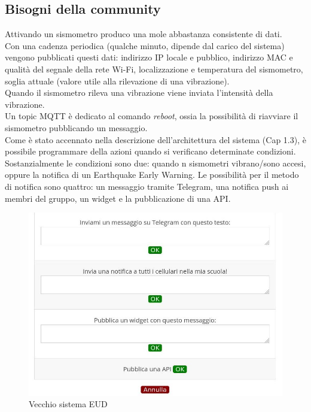 \documentclass[a4paper,10pt]{memoir}
\begin{document}
\subsection{Bisogni della community}

Attivando un sismometro produco una mole abbastanza consistente di dati.\\
Con una cadenza periodica (qualche minuto, dipende dal carico del sistema) vengono pubblicati questi dati: indirizzo IP locale e pubblico, indirizzo MAC e qualità del segnale della rete Wi-Fi, localizzazione e temperatura del sismometro, soglia attuale (valore utile alla rilevazione di una vibrazione).\\
Quando il sismometro rileva una vibrazione viene inviata l'intensità della vibrazione.\\
Un topic MQTT è dedicato al comando \textit{reboot}, ossia la possibilità di riavviare il sismometro pubblicando un messaggio.\\
Come è stato accennato nella descrizione dell'architettura del sistema (Cap 1.3), è possibile programmare della azioni quando si verificano determinate condizioni.\\
Sostanzialmente le condizioni sono due: quando n sismometri vibrano/sono accesi, oppure la notifica di un Earthquake Early Warning.
Le possibilità per il metodo di notifica sono quattro: un messaggio tramite Telegram, una notifica push ai membri del gruppo, un widget e la pubblicazione di una API.\\

\begin{figure}[H]
\caption{Vecchio sistema EUD}
\label{VecchioEUD}
\includegraphics[width=1\textwidth]{Chapter-1/eud-vecchio.jpg}
\end{figure}
\end{document}
